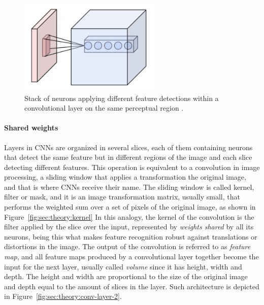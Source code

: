 \begin{figure}[htb]
  \begin{center}
    \includegraphics[width=0.6\textwidth]{gfx/conv-layer-1}
  \end{center}
  \caption{Stack of neurons applying different feature detections within a convolutional layer on the same perceptual region \cite{Aphex342015}.}
  \label{fig:sec:theory:conv-layer-1}
\end{figure}

\paragraph{Shared weights}
Layers in CNNs are organized in several slices, each of them containing neurons that detect the same feature but in different regions of the image and each slice detecting different features.
This operation is equivalent to a convolution in image processing, a sliding window that applies a transformation the original image, and that is where CNNs receive their name.
The sliding window is called kernel, filter or mask, and it is an image transformation matrix, usually small, that performs the weighted sum over a set of pixels of the original image, as shown in Figure~\ref{fig:sec:theory:kernel}
In this analogy, the kernel of the convolution is the filter applied by the slice over the input, represented by \emph{weights shared} by all its neurons, being this what makes feature recognition robust against translations or distortions in the image.
The output of the convolution is referred to as \emph{feature map}, and all feature maps produced by a convolutional layer together become the input for the next layer, usually called \emph{volume} since it has height, width and depth.
The height and width are proportional to the size of the original image and depth equal to the amount of slices in the layer.
Such architecture is depicted in Figure~\ref{fig:sec:theory:conv-layer-2}.

